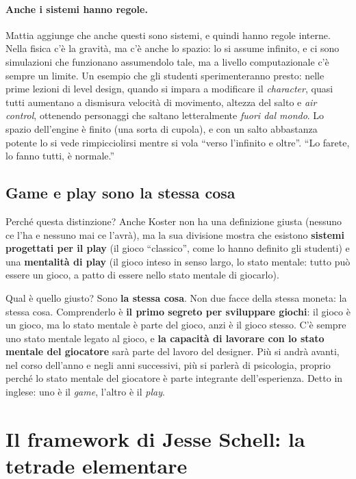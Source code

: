 \paragraph{Anche i sistemi hanno regole.} Mattia aggiunge che anche questi
sono sistemi, e quindi hanno regole interne. Nella fisica c'è la gravità, ma
c'è anche lo spazio: lo si assume infinito, e ci sono simulazioni che
funzionano assumendolo tale, ma a livello computazionale c'è sempre un limite.
Un esempio che gli studenti sperimenteranno presto: nelle prime lezioni di
level design, quando si impara a modificare il \emph{character}, quasi tutti
aumentano a dismisura velocità di movimento, altezza del salto e \emph{air
control}, ottenendo personaggi che saltano letteralmente \emph{fuori dal
mondo}. Lo spazio dell'engine è finito (una sorta di cupola), e con un salto
abbastanza potente lo si vede rimpicciolirsi mentre si vola ``verso l'infinito e
oltre''. ``Lo farete, lo fanno tutti, è normale.''

\subsection{Game e play sono la stessa cosa}

Perché questa distinzione? Anche Koster non ha una definizione giusta (nessuno
ce l'ha e nessuno mai ce l'avrà), ma la sua divisione mostra che esistono
\textbf{sistemi progettati per il play} (il gioco ``classico'', come lo hanno
definito gli studenti) e una \textbf{mentalità di play} (il gioco inteso in
senso largo, lo stato mentale: tutto può essere un gioco, a patto di essere
nello stato mentale di giocarlo).

Qual è quello giusto? Sono \textbf{la stessa cosa}. Non due facce della stessa
moneta: la stessa cosa. Comprenderlo è \textbf{il primo segreto per sviluppare
giochi}: il gioco è un gioco, ma lo stato mentale è parte del gioco, anzi è il
gioco stesso. C'è sempre uno stato mentale legato al gioco, e \textbf{la
capacità di lavorare con lo stato mentale del giocatore} sarà parte del lavoro
del designer. Più si andrà avanti, nel corso dell'anno e negli anni
successivi, più si parlerà di psicologia, proprio perché lo stato mentale del
giocatore è parte integrante dell'esperienza. Detto in inglese: uno è il
\emph{game}, l'altro è il \emph{play}.

\section{Il framework di Jesse Schell: la tetrade elementare}
\label{sec:schell}

